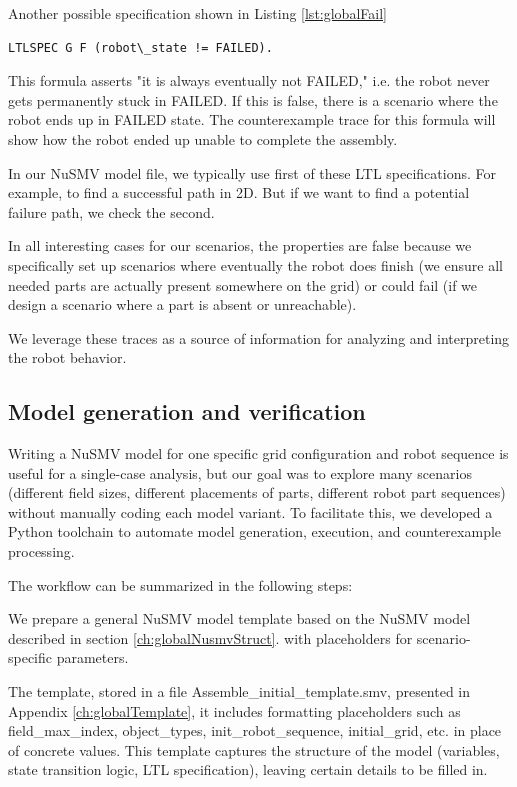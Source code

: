 Another possible specification shown in Listing \ref{lst:globalFail}
\begin{lstlisting}[language=NuSMV, caption={Terminal conditions for FINISHED and FAILED}, 
    label={lst:globalFail}]
    LTLSPEC G F (robot\_state != FAILED). 
\end{lstlisting}
This formula asserts "it is always eventually not FAILED," i.e. the 
robot never gets permanently stuck in FAILED. If this is false, there 
is a scenario where the robot ends up in FAILED state. The counterexample trace 
for this formula will show how the robot ended up unable to complete the 
assembly.

In our NuSMV model file, we typically use first of these LTL specifications.
For example, to find a successful path in 2D.
But if we want to find a potential failure path, we check the second. 

In all interesting cases for our scenarios, the properties are 
false because we specifically set up scenarios where eventually the 
robot does finish (we ensure all needed parts are actually present somewhere 
on the grid) or could fail (if we design a scenario where a part is 
absent or unreachable). 

We leverage these traces as a source of information for 
analyzing and interpreting the robot behavior.


\subsection{Model generation and verification}

Writing a NuSMV model for one specific grid configuration and robot sequence is 
useful for a single-case analysis, but our goal was to explore many scenarios 
(different field sizes, different placements of parts, different robot 
part sequences) without manually coding each model variant. To facilitate this,
we developed a Python toolchain to automate model generation, execution,
and counterexample processing. 

The workflow can be summarized in the following steps:

We prepare a general NuSMV model template based on the  NuSMV model 
described in section \ref{ch:globalNusmvStruct}.
with placeholders for scenario-specific parameters. 

The template, stored in a file Assemble\_initial\_template.smv,
presented in Appendix \ref{ch:globalTemplate}, 
it includes formatting placeholders such 
as {field\_max\_index}, {object\_types}, {init\_robot\_sequence}, {
initial\_grid}, etc. in place of concrete values.
This template captures the structure of the model (variables, state transition 
logic, LTL specification), leaving certain details to be filled in.

